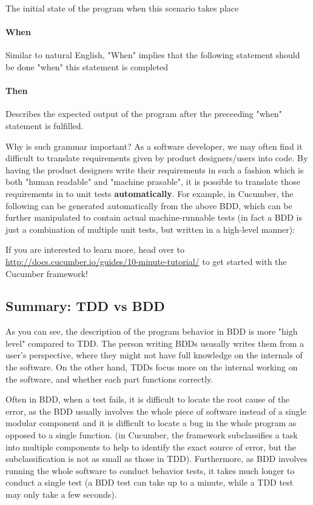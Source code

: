 The initial state of the program when this scenario takes place

\paragraph{When}

Similar to natural English, "When" implies that the following statement should be done "when" this statement is completed

\paragraph{Then}

Describes the expected output of the program after the preceeding "when" statement is fulfilled. 

Why is such grammar important? As a software developer, we may often find it difficult to translate requirements given by product designers/users into code. By having the product designers write their requirements in such a fashion which is both "human readable" and "machine prasable", it is possible to translate those requirements in to unit tests \textbf{automatically}. For example, in Cucumber, the following can be generated automatically from the above BDD, which can be further manipulated to contain actual machine-runnable tests (in fact a BDD is just a combination of multiple unit tests, but written in a high-level manner):


If you are interested to learn more, head over to \url{http://docs.cucumber.io/guides/10-minute-tutorial/} to get started with the Cucumber framework!

\subsection{Summary: TDD vs BDD}

As you can see, the description of the program behavior in BDD is more "high level" compared to TDD. The person writing BDDs ususally writes them from a user's perspective, where they might not have full knowledge on the internals of the software. On the other hand, TDDs focus more on the internal working on the software, and whether each part functions correctly. 

Often in BDD, when a test fails, it is difficult to locate the root cause of the error, as the BDD usually involves the whole piece of software instead of a single modular component and it is difficult to locate a bug in the whole program as opposed to a single function. (in Cucumber, the framework subclassifies a task into multiple components to help to identify the exact source of error, but the subclassification is not as small as those in TDD). Furthermore, as BDD involves running the whole software to conduct behavior tests, it takes much longer to conduct a single test (a BDD test can take up to a minute, while a TDD test may only take a few seconds). 

